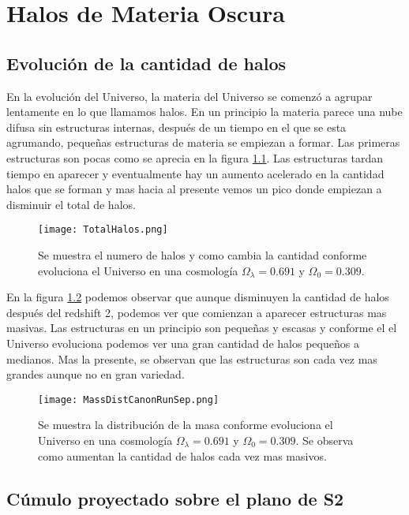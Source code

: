 
\chapter{Halos de Materia Oscura}
\setcounter{equation}{0}



\section{Evolución de la cantidad de halos}


En la evolución del Universo, la materia del Universo se comenzó a agrupar lentamente en lo que llamamos halos. En un principio la materia parece una nube difusa sin estructuras internas, después de un tiempo en el que se esta agrumando, pequeñas estructuras de materia se empiezan a formar. Las primeras estructuras son pocas como se aprecia en la figura \ref{fig:EvoNumTotHalos}. Las estructuras tardan tiempo en aparecer y eventualmente hay un aumento acelerado en la cantidad halos que se forman y mas hacia al presente vemos un pico donde empiezan a disminuir el total de halos.

\begin{figure}[ht!]
    \centering
    \texttt{[image: TotalHalos.png]}
    \caption[Evolución del número de halos en un Universo $\Omega_\lambda = 0.691 $, $\Omega_0 = 0.309$]{Se muestra el numero de halos y como cambia la cantidad conforme evoluciona el Universo en una cosmología $\Omega_\lambda = 0.691 $ y $\Omega_0 = 0.309$.}
    \label{fig:EvoNumTotHalos}
\end{figure}

En la figura \ref{fig:MassDistCanonRunSep} podemos observar que aunque disminuyen la cantidad de halos después del redshift 2, podemos ver que comienzan a aparecer estructuras mas masivas. Las estructuras en un principio son pequeñas y escasas y conforme el el Universo evoluciona podemos ver una gran cantidad de halos pequeños a medianos. Mas la presente, se observan que las estructuras son cada vez mas grandes aunque no en gran variedad.

\begin{figure}[ht!]
    \centering
    \texttt{[image: MassDistCanonRunSep.png]}
    \caption[Distribución de masa en la evolución de un Universo $\Omega_\lambda = 0.691 $, $\Omega_0 = 0.309$]{Se muestra la distribución de la masa conforme evoluciona el Universo en una cosmología $\Omega_\lambda = 0.691 $ y $\Omega_0 = 0.309$. Se observa como aumentan la cantidad de halos cada vez mas masivos.}
    \label{fig:MassDistCanonRunSep}
\end{figure}



\section{Cúmulo proyectado sobre el plano de S2}


